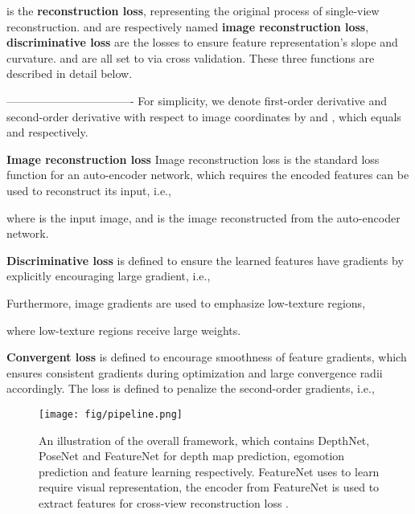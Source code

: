 \documentclass[runningheads]{llncs}
\begin{document}
 is the \textbf{reconstruction loss}, representing the original process of single-view reconstruction.  and  are respectively named \textbf{image reconstruction loss}, \textbf{discriminative loss} are the losses to ensure feature representation's slope and curvature.   and  are all set to  via cross validation. These three functions are described in detail below.

----------------------------------
\fi
For simplicity, we denote first-order derivative and second-order derivative with respect to image coordinates by  and , which equals  and  respectively.

\textbf{Image reconstruction loss}
Image reconstruction loss  is the standard loss function for an auto-encoder network, which requires the encoded features can be used to reconstruct its input, i.e.,

where  is the input image, and  is the image reconstructed from the auto-encoder network. 




\textbf{Discriminative loss}  is defined to ensure the learned features have gradients  by explicitly encouraging large gradient, i.e.,

Furthermore, image gradients are used to emphasize low-texture regions,  

where low-texture regions receive large weights. 




\textbf{Convergent loss}  is defined to encourage smoothness of feature gradients, which ensures consistent gradients during optimization and large convergence radii accordingly. The loss is defined to penalize the second-order gradients, i.e.,










\begin{figure*}[!tp]
\centering
\texttt{[image: fig/pipeline.png]}
\caption{
An illustration of the overall framework, which contains DepthNet, PoseNet and FeatureNet for depth map prediction, egomotion prediction and feature learning respectively.
FeatureNet uses  to learn require visual representation, the encoder from FeatureNet is used to extract features for cross-view reconstruction loss .
}
\label{fig3}
\end{figure*}
\end{document}
